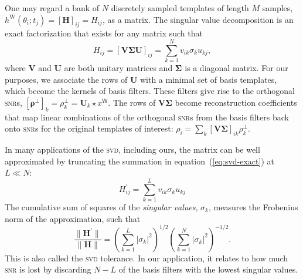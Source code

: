   One may regard a bank of $N$ discretely sampled templates of length
$M$ samples, $h^\mathrm W(\theta_i; t_j) = [\mathbf H]_{ij} = H_{ij}$, as a
matrix.  The singular value decomposition is an exact factorization that exists
for any matrix such that
%
\begin{equation} \label{eq:svd-exact}
%
H_{ij} = [\mathbf {V \Sigma U}]_{ij} = \sum_{k=1}^{N} v_{ik} \sigma_k u_{kj},
%
\end{equation}
%
where $\mathbf V$ and $\mathbf U$ are both unitary matrices and $\mathbf
\Sigma$ is a diagonal matrix.  For our purposes, we associate the rows of
$\mathbf U$ with a minimal set of basis templates, which become the kernels of
basis filters.  These filters give rise to the orthogonal \textsc{snr}s,
$[\mathbf \rho^\perp]_k = \rho_k^\perp = \mathbf{U}_k \star x^\mathsf{W}$.  The
rows of $\mathbf{V \Sigma}$ become reconstruction coefficients that map linear
combinations of the orthogonal \textsc{snr}s from the basis filters back onto
\textsc{snr}s for the original templates of interest: $\rho_i = \sum_k [\mathbf
V \mathbf \Sigma]_{ik} \rho_k^\perp$.

In many applications of the \textsc{svd}, including ours, the matrix can be
well approximated by truncating the summation in equation~(\ref{eq:svd-exact})
at $L \ll N$:
%
\begin{equation}
%
H_{ij}^\prime = \sum_{k=1}^{L} v_{ik} \sigma_k u_{kj}
%
\end{equation}
%
The cumulative sum of squares of the {\em singular values}, $\sigma_k$,
measures the Frobenius norm of the approximation, such that
%
\begin{equation}
%
\frac{\| \mathbf H^\prime \|}{\| \mathbf H \|} = \left(\sum_{k=1}^{L}
|\sigma_k|^2\right)^{1/2} \left(\sum_{k=1}^{N} |\sigma_k|^2\right)^{-1/2}.
%
\end{equation}
%
This is also called the \textsc{svd} tolerance.  In our application, it relates
to how much \textsc{snr} is lost by discarding $N - L$ of the basis filters
with the lowest singular values.

